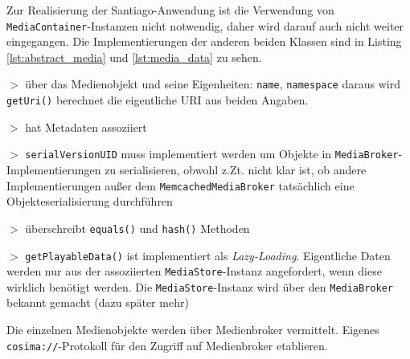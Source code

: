   Zur Realisierung der Santiago-Anwendung ist die Verwendung von \verb!MediaContainer!-Instanzen nicht notwendig, daher wird darauf auch nicht weiter eingegangen. Die Implementierungen der anderen beiden Klassen sind in Listing \ref{lst:abstract_media} und \ref{lst:media_data} zu sehen.

  

  
  
  $>$ über das Medienobjekt und seine Eigenheiten: \verb!name!, \verb!namespace! daraus wird \verb!getUri()! berechnet die eigentliche URI aus beiden Angaben.
  
  $>$ hat Metadaten assoziiert
  
  $>$ \verb!serialVersionUID! muss implementiert werden um Objekte in \verb!MediaBroker!-Implementierungen zu serialisieren, obwohl z.Zt. nicht klar ist, ob andere Implementierungen außer dem \verb!MemcachedMediaBroker! tatsächlich eine Objekteserialisierung durchführen
  
  $>$ überschreibt \verb!equals()! und \verb!hash()! Methoden
  
  $>$ \verb!getPlayableData()! ist implementiert als \emph{Lazy-Loading}. Eigentliche Daten werden nur aus der assoziierten \verb!MediaStore!-Instanz angefordert, wenn diese wirklich benötigt werden. Die \verb!MediaStore!-Instanz wird über den \verb!MediaBroker! bekannt gemacht (dazu später mehr)
 
  Die einzelnen Medienobjekte werden über Medienbroker vermittelt. Eigenes \verb!cosima://!-Protokoll für den Zugriff auf Medienbroker etablieren.
  

  

  

